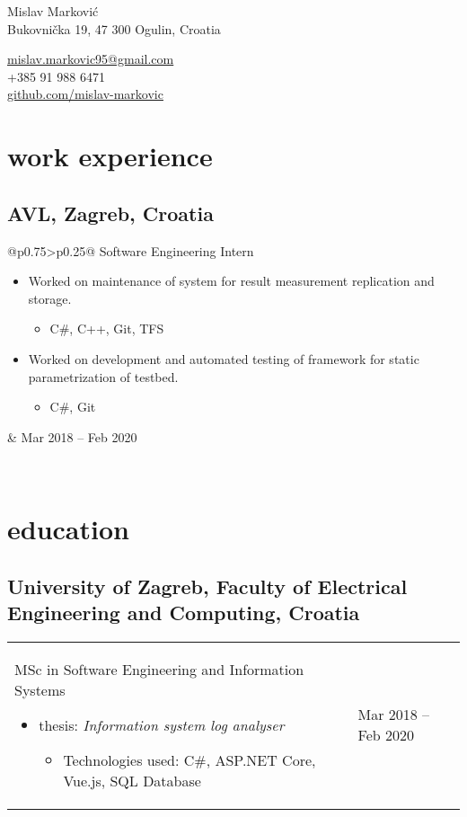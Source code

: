 \documentclass[a4paper]{article}
\makeatletter
\newlength{\tablewidth}
\newenvironment{period}[2]{%
\newcommand{\sarma}{#2}%
\setlength{\tablewidth}{\linewidth}
\addtolength{\tablewidth}{-2\tabcolsep}
\begin{tabular}{@{}p{0.75\tablewidth}>{\raggedleft\arraybackslash}p{0.25\tablewidth}@{}}%
#1 \newline
\begin{itemize}
}{%
\end{itemize} & \sarma \\%
\end{tabular}\\
}
\makeatother
\begin{document}
\fontfamily{\sfdefault}
\selectfont

\begin{minipage}{.5\textwidth}
\LARGE{Mislav Marković}\\
\normalsize{Bukovnička 19, 47 300 Ogulin, Croatia}
\end{minipage}%
\begin{minipage}{.5\textwidth}
\raggedleft
\href{mailto:mislav.markovic95@gmail.com}{mislav.markovic95@gmail.com} \\
+385 91 988 6471 \\
\href{https://github.com/mislav-markovic}{github.com/mislav-markovic}
\end{minipage}

\vspace{1em}

\section{work experience}
\subsection{AVL, Zagreb, Croatia}
\begin{period}{Software Engineering Intern}{Mar 2018 -- Feb 2020}
    \item 
        Worked on maintenance of system for result measurement replication and storage.
        \begin{itemize}
            \item C\#, C++, Git, TFS
        \end{itemize}
        \item 
        Worked on development and automated testing of framework for static parametrization of testbed.
        \begin{itemize}
            \item C\#, Git
        \end{itemize}
\end{period}


\section{education}
\subsection{University of Zagreb, Faculty of Electrical Engineering and Computing, Croatia}
\begin{period}{MSc in Software Engineering and Information Systems}{Sep 2017 -- Feb 2020}
    \item thesis:
        \textit{Information system log analyser}
			\begin{itemize}
			    \item Technologies used: C\#, ASP.NET Core, Vue.js, SQL Database
			\end{itemize}
\end{period}
\end{document}
